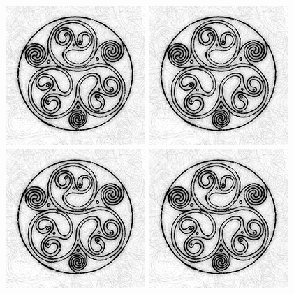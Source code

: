 \documentclass{article}
\begin{document}
\includegraphics[scale=0.3]{helvetios}
\includegraphics[scale=0.5]{helvetios}
\includegraphics[scale=0.7]{helvetios}
\includegraphics[scale=0.8]{helvetios}
\end{document}
